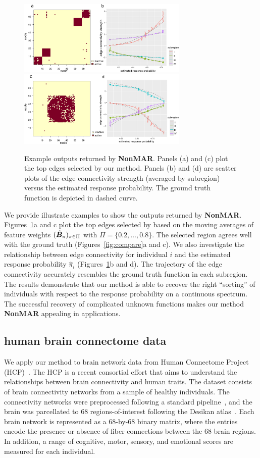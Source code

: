 \documentclass[11pt]{article}
\theoremstyle{plain}
\theoremstyle{definition}
\def\NonparaM{\text{\bf \small NonMAR }}
\begin{document}
\begin{figure}[ht]
    \centering
   \includegraphics[width=8.1cm]{est_block.pdf}
          \includegraphics[width=8.1cm]{est_circle.pdf}
 \caption{Example outputs returned by {\bf \small NonMAR}. Panels (a) and (c) plot the top edges selected by our method. Panels (b) and (d) are scatter plots of the edge connectivity strength (averaged by subregion) versus the estimated response probability. The ground truth function is depicted in dashed curve.}\label{fig:compare2}
\end{figure}


We provide illustrate examples to show the outputs returned by {\bf \small NonMAR}. Figures~\ref{fig:compare2}a and c plot the top edges selected by \NonparaM based on the moving averages of feature weights $(\hat {\bm B}_\pi)_{\pi\in\Pi}$ with  $\Pi = \{0.2,\ldots,0.8\}$. The selected region agrees well with the ground truth (Figures~\ref{fig:compare}a and c). We also investigate the relationship between edge connectivity for individual $i$ and the estimated response probability $\hat \pi_i$ (Figures~\ref{fig:compare2}b and d). The trajectory of the edge connectivity accurately resembles the ground truth function in each subregion. The results demonstrate that our method is able to recover the right ``sorting'' of individuals with respect to the response probability on a continuous spectrum. 
The successful recovery of complicated unknown functions makes our method {\bf \small NonMAR} appealing in applications. 

\subsection{human brain connectome data}\label{sec:real}
We apply our method to brain network data from Human Connectome Project (HCP)~\citep{van2013wu}. The HCP is a recent consortial effort that aims to understand the relationships between brain connectivity and human traits. The dataset consists of brain connectivity networks from a sample of healthy individuals. The connectivity networks were preprocessed following a standard pipeline~\citep{zhang2018mapping}, and the brain was parcellated to 68 regions-of-interest following the Desikan atlas~\citep{desikan2006automated}. Each brain network is represented as a 68-by-68 binary matrix, where the entries encode the presence or absence of fiber connections between the 68 brain regions. In addition, a range of cognitive, motor, sensory, and emotional scores are measured for each individual. 
\end{document}

